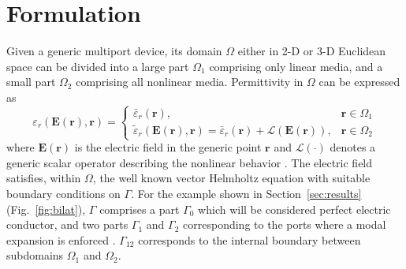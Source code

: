 \documentclass[journal,twoside]{IEEEtran}
\renewcommand{\vec}[1]{\mathbf{#1}}
\begin{document}
\section{Formulation}
\label{sec:Formulation}
%
%
Given a generic multiport device, 
its domain $\Omega$ either in \mbox{2-D} or \mbox{3-D} Euclidean space
can be divided into a large part $\Omega_1$ comprising only linear media, and 
a small part $\Omega_2$ comprising all nonlinear media.
Permittivity in $\Omega$ can be expressed as
\begin{equation}
\varepsilon_r(\vec{E}(\vec{r}),\vec{r})\!=\! 
\begin{cases}
\bar{\varepsilon}_r(\vec{r}), & \vec{r} \in \Omega_1 \\
\tilde{\varepsilon}_r(\vec{E}(\vec{r}), \vec{r}) \!=\!
\bar{\varepsilon}_r(\vec{r}) \!+\! \mathcal{L}(\vec{E}(\vec{r})), & \vec{r} \in
\Omega_2
\end{cases}
\end{equation} 
%
\noindent where $\vec{E}(\vec{r})$ is the electric field in the generic point
$\vec{r}$ and $\mathcal{L}(\cdot)$ denotes a generic scalar operator describing 
the nonlinear behavior \cite{Guarnieri2010}. The electric field satisfies, 
within $\Omega$, the well known vector Helmholtz equation 
%
with suitable boundary conditions on $\Gamma$. For the example shown 
in Section~\ref{sec:results} (Fig.~\ref{fig:bilat}), $\Gamma$
comprises a part $\Gamma_0$ which will be considered perfect electric conductor,
and two parts $\Gamma_1$ and $\Gamma_2$ 
corresponding to the ports where a modal expansion is enforced \cite{Pelosi2009}. 
$\Gamma_{12}$ corresponds to the internal boundary between subdomains $\Omega_1$
and $\Omega_2$.
\end{document}
